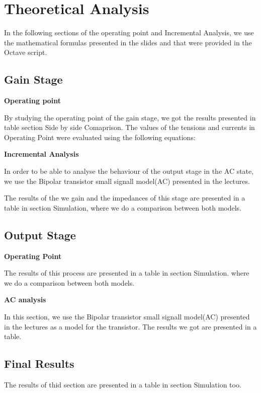 \section{Theoretical Analysis}
\label{sec:analysis}

In the following sections of the operating point and Incremental Analysis, we use the mathematical formulas presented in the slides
and that were provided in the Octave script.

\subsection{Gain Stage}


\textbf{Operating point}

By studying the operating point of the gain stage, we got the results presented in table section Side by side Comaprison.
The values of the tensions and currents in Operating Point were evaluated using the following equations:


\textbf{Incremental Analysis}

In order to be able to analyse the behaviour of the output stage in the AC state, we use the Bipolar transistor small signall model(AC) presented in the lectures.

The results of the we gain and the impedances of this stage are presented in a table in section Simulation, where we do a comparison between both models.



\subsection{Output Stage}

\textbf{Operating Point}

The results of this process are presented in a table in section Simulation. where we do a comparison between both models.

\textbf{AC analysis}

In this section, we use the Bipolar transistor small signall model(AC) presented in the lectures as a model for the transistor.
The results we got are presented in a table.

\subsection{Final Results}

The results of thid section are presented in a table in section Simulation too.

